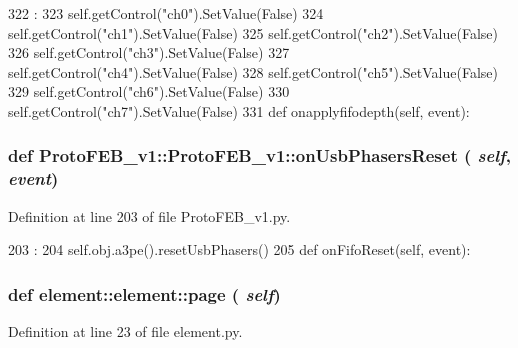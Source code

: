 \begin{DoxyCode}
322                                 :
323         self.getControl("ch0").SetValue(False)
324         self.getControl("ch1").SetValue(False)
325         self.getControl("ch2").SetValue(False)
326         self.getControl("ch3").SetValue(False)
327         self.getControl("ch4").SetValue(False)
328         self.getControl("ch5").SetValue(False)
329         self.getControl("ch6").SetValue(False)
330         self.getControl("ch7").SetValue(False)
331 
    def onapplyfifodepth(self, event):
\end{DoxyCode}
\hypertarget{classProtoFEB__v1_1_1ProtoFEB__v1_aa90a777d0cd810c0fab236d3fb29429c}{
\subsubsection[{onUsbPhasersReset}]{\setlength{\rightskip}{0pt plus 5cm}def ProtoFEB\_\-v1::ProtoFEB\_\-v1::onUsbPhasersReset ( {\em self}, \/   {\em event})}}
\label{classProtoFEB__v1_1_1ProtoFEB__v1_aa90a777d0cd810c0fab236d3fb29429c}


Definition at line 203 of file ProtoFEB\_\-v1.py.


\begin{DoxyCode}
203                                       :
204         self.obj.a3pe().resetUsbPhasers()
205 
    def onFifoReset(self, event):
\end{DoxyCode}
\hypertarget{classelement_1_1element_acb01482fd72cc106f0e16e08c4df276a}{
\subsubsection[{page}]{\setlength{\rightskip}{0pt plus 5cm}def element::element::page ( {\em self})}}
\label{classelement_1_1element_acb01482fd72cc106f0e16e08c4df276a}


Definition at line 23 of file element.py.


